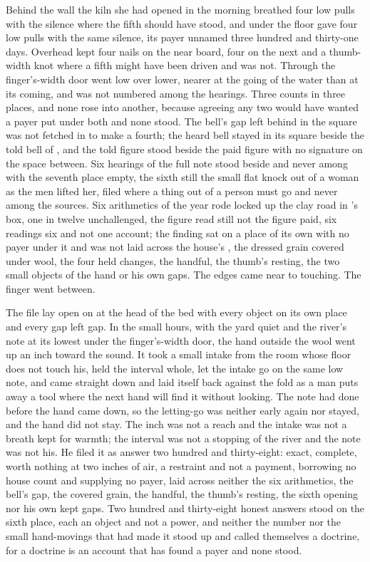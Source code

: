 Behind the wall the kiln she had opened in the morning breathed four low pulls with the silence where the fifth should have stood, and under the floor  gave four low pulls with the same silence, its payer unnamed three hundred and thirty-one days. Overhead  kept four nails on the near board, four on the next and a thumb-width knot where a fifth might have been driven and was not. Through the finger's-width door  went low over lower, nearer at the going of the water than at its coming, and was not numbered among the hearings. Three counts in three places, and none rose into another, because agreeing any two would have wanted a payer put under both and none stood. The bell's gap left behind in the square was not fetched in to make a fourth; the heard bell stayed in its square beside the told bell of , and the told figure stood beside the paid figure with no signature on the space between. Six hearings of the full note stood beside and never among with the seventh place empty, the sixth still the small flat knock out of a woman as the men lifted her, filed where a thing out of a person must go and never among the sources. Six arithmetics of the year rode locked up the clay road in 's box, one in twelve unchallenged, the figure read still not the figure paid, six readings six and not one account; the finding sat on a place of its own with no payer under it and was not laid across the house's , the dressed grain covered under wool, the four held changes, the handful, the thumb's resting, the two small objects of the hand or his own gaps. The edges came near to touching. The finger went between.

The file lay open on  at the head of the bed with every object on its own place and every gap left gap. In the small hours, with the yard quiet and the river's note at its lowest under the finger's-width door, the hand outside the wool went up an inch toward the sound. It took a small intake from the room whose floor does not touch his, held the interval whole, let the intake go on the same low note, and came straight down and laid itself back against the fold as a man puts away a tool where the next hand will find it without looking. The note had done before the hand came down, so the letting-go was neither early again nor stayed, and the hand did not stay. The inch was not a reach and the intake was not a breath kept for warmth; the interval was not a stopping of the river and the note was not his. He filed it as answer two hundred and thirty-eight: exact, complete, worth nothing at two inches of air, a restraint and not a payment, borrowing no house count and supplying no payer, laid across neither the six arithmetics, the bell's gap, the covered grain, the handful, the thumb's resting, the sixth opening nor his own kept gaps. Two hundred and thirty-eight honest answers stood on the sixth place, each an object and not a power, and neither the number nor the small hand-movings that had made it stood up and called themselves a doctrine, for a doctrine is an account that has found a payer and none stood.


